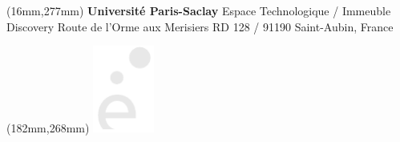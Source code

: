 \begin{textblock*}{161mm}(16mm,277mm)
\renewcommand{\familydefault}{\sfdefault}
\color{bordeau}
{\bf\noindent Université Paris-Saclay	         } \newline
\noindent Espace Technologique / Immeuble Discovery \newline
\noindent Route de l’Orme aux Merisiers RD 128 / 91190 Saint-Aubin, France 
\end{textblock*}

\begin{textblock*}{20mm}(182mm,268mm)
\includegraphics[width=20mm]{Figs/e.pdf}
\end{textblock*}